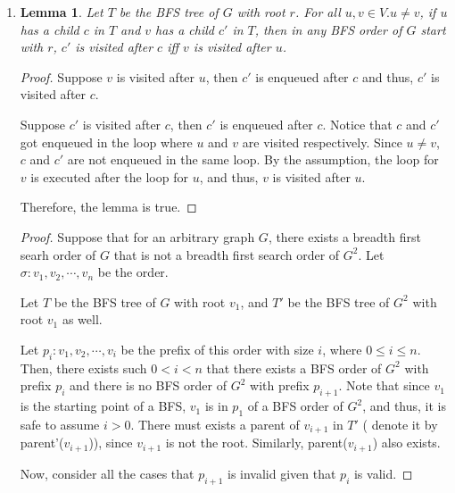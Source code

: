 \documentclass[10pt]{article}
\newtheorem{lemma}[theorem]{Lemma}
\begin{document}
\begin{enumerate}
	\item
	\begin{comment}
		Prove that any breadth first search order of $G$ is also a breadth
		frist search order of $G^2$
	\end{comment}
		\begin{lemma}
			Let $T$ be the BFS tree of $G$ with root $r$.
			For all $u, v \in V. u \neq v$, if $u$ has a child $c$ in $T$ and
			$v$ has a child $c'$ in $T$, then in any BFS order of $G$ start
			with $r$, $c'$ is visited after $c$ iff $v$ is visited after $u$.
		\end{lemma}
		\begin{proof}
			Suppose $v$ is visited after $u$, then $c'$ is enqueued after $c$
			and thus, $c'$ is visited after $c$. 

			Suppose $c'$ is visited after $c$, then $c'$ is enqueued after $c$.
			Notice that $c$ and $c'$ got enqueued in the loop where $u$ and $v$
			are visited respectively. 
			Since $u \neq v$, $c$ and $c'$ are not enqueued in the same loop.
			By the assumption, the loop for $v$ is executed after the loop for
			$u$, and thus, $v$ is visited after $u$.

			Therefore, the lemma is true.
		\end{proof}


		\begin{proof}
			Suppose that for an arbitrary graph $G$, there exists a breadth first
			searh order of $G$ that is not a breadth first search order of
			$G^2$. Let $\sigma: v_1, v_2, \cdots, v_n$ be the order.

			Let $T$ be the BFS tree of $G$ with root $v_1$, and $T'$ be the
			BFS tree of $G^2$ with root $v_1$ as well.

			Let $p_i: v_1, v_2, \cdots, v_i$ be the prefix of this order with size
			$i$, where $0 \leq i \leq n$.
			Then, there exists such $0 < i < n$ that there exists a BFS order of $G^2$
			with prefix $p_i$ and there is no BFS order of $G^2$ with prefix
			$p_{i+1}$.
			Note that since $v_1$ is the starting point of a BFS, $v_1$
			is in $p_1$ of a BFS order of $G^2$, and thus, it is safe to
			assume $i > 0$.
			There must exists a parent of $v_{i+1}$ in $T'$ ( denote it by
			parent'($v_{i+1}$)), since $v_{i+1}$ is not the root.
			Similarly, parent($v_{i+1}$) also exists.

			Now, consider all the cases that $p_{i+1}$ is invalid given that
			$p_i$ is valid. 
			

\end{proof}
\end{enumerate}
\end{document}
